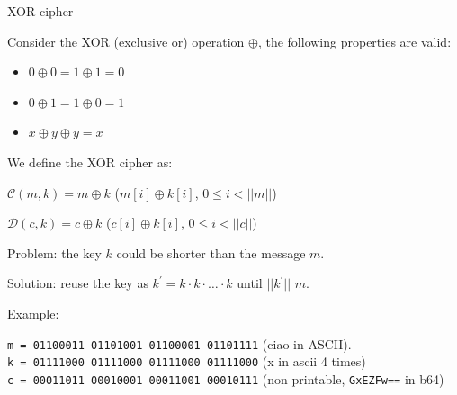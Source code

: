 \begin{frame}{XOR cipher}

  Consider the XOR (exclusive or) operation $\oplus$, the following properties are valid:
  
  \begin{itemize}
    \item $0 \oplus 0 = 1 \oplus 1 = 0$ 
    \item $0 \oplus 1 = 1 \oplus 0 = 1$ 
    \item $x \oplus y \oplus y = x$ 
  \end{itemize}
  
  \medskip
  \pause
  
  We define the XOR cipher as:
    
  $\mathcal{C}(m, k) = m \oplus k$ \phantom{padding} ($m[i] \oplus k[i]$, $0 \leq i < ||m||$)
  
  $\mathcal{D}(c, k) = c \oplus k$ \phantom{padding} ($c[i] \oplus k[i]$, $0 \leq i < ||c||$)

  \medskip
  
  \pause

  Problem: the key $k$ could be shorter than the message $m$.
  
  Solution: reuse the key as $k^{'} = k \cdot k \cdot \ldots \cdot k$ until $||k^{'}||$ $m$.

  \medskip
  \pause
  
  Example:
  
  \texttt{m = 01100011 01101001 01100001 01101111} (ciao in ASCII).\\
  \texttt{k = 01111000 01111000 01111000 01111000} (x in ascii 4 times)\\
  \texttt{c = 00011011 00010001 00011001 00010111} (non printable, \texttt{GxEZFw==} in b64)
  
\end{frame}

